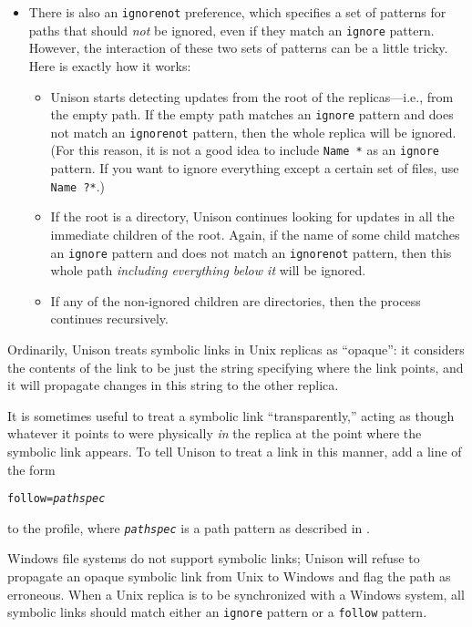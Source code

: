 \documentclass{article}
\newcommand{\ARG}[1]{\texttt{\textit{#1}}}
\begin{document}
\begin{itemize}
\item There is also an \verb|ignorenot| preference, which specifies a set of
  patterns for paths that should {\em not} be ignored, even if they match an
  \verb|ignore| pattern.  However, the interaction of these two sets of
  patterns can be a little tricky.  Here is exactly how it works:
  \begin{itemize}
  \item Unison starts detecting updates from the root of the
  replicas---i.e., from the empty path.  If the empty path matches an
  \verb|ignore| pattern and does not match an \verb|ignorenot| pattern, then
  the whole replica will be ignored.  (For this reason, it is not a good
  idea to include \verb|Name *| as an \verb|ignore| pattern.  If you want to
  ignore everything except a certain set of files, use \verb|Name ?*|.)
  \item If the root is a directory, Unison continues looking for updates in
  all the immediate children of the root.  Again, if the name of some child matches an
  \verb|ignore| pattern and does not match an \verb|ignorenot| pattern, then
  this whole path {\em including everything below it} will be ignored.
  \item If any of the non-ignored children are directories, then the process
  continues recursively.
  \end{itemize}
\end{itemize}


Ordinarily, Unison treats symbolic links in Unix replicas as
``opaque'': it considers the contents of the link to be just the
string specifying where the link points, and it will propagate changes in
this string to the other replica.

It is sometimes useful to treat a symbolic link ``transparently,''
acting as though whatever it points to were physically {\em in} the
replica at the point where the symbolic link appears.  To tell Unison
to treat a link in this manner, add a line of the form
\begin{alltt}
             follow = \ARG{pathspec}
\end{alltt}
to the profile, where \ARG{pathspec} is a path pattern as described in
.

Windows file systems do not support symbolic links; Unison will refuse
to propagate an opaque symbolic link from Unix to Windows and flag the
path as erroneous.  When a Unix replica is to be synchronized with a
Windows system, all symbolic links should match either an
\verb|ignore| pattern or a \verb|follow| pattern.
\end{document}

